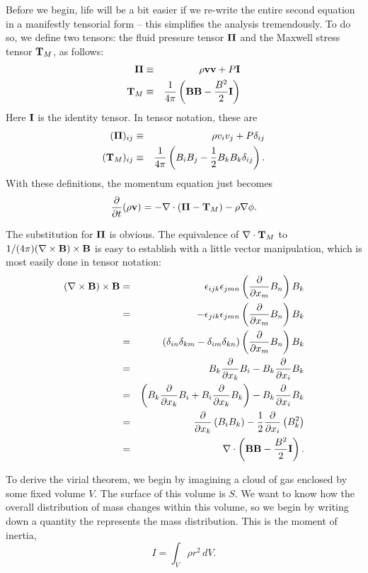 Before we begin, life will be a bit easier if we re-write the entire second equation in a manifestly tensorial form -- this simplifies the analysis tremendously. To do so, we define two tensors: the fluid pressure tensor $\boldsymbol{\Pi}$ and the Maxwell stress tensor $\mathbf{T}_M$, as follows:
\begin{eqnarray}
\boldsymbol{\Pi} & \equiv & \rho \mathbf{v}\mathbf{v} + P\mathbf{I} \\
\mathbf{T}_M & \equiv & \frac{1}{4\pi} \left(\mathbf{B}\mathbf{B} - \frac{B^2}{2}\mathbf{I}\right)
\end{eqnarray}
Here $\mathbf{I}$ is the identity tensor. In tensor notation, these are
\begin{eqnarray}
(\boldsymbol{\Pi})_{ij} & \equiv & \rho v_i v_j + P \delta_{ij} \\
(\mathbf{T}_M)_{ij} & \equiv & \frac{1}{4\pi} \left(B_i B_j - \frac{1}{2}B_k B_k \delta_{ij}\right).
\end{eqnarray}
With these definitions, the momentum equation just becomes
\begin{equation}
\frac{\partial}{\partial t}(\rho \mathbf{v}) = -\nabla\cdot(\boldsymbol{\Pi}-\mathbf{T}_M) - \rho \nabla\phi.
\end{equation}

The substitution for $\boldsymbol{\Pi}$ is obvious. The equivalence of $\nabla\cdot\mathbf{T}_M$ to $1/(4\pi) (\nabla\times\mathbf{B})\times\mathbf{B}$ is easy to establish with a little vector manipulation, which is most easily done in tensor notation:
\begin{eqnarray}
(\nabla\times\mathbf{B})\times\mathbf{B} & = & \epsilon_{ijk} \epsilon_{jmn} \left(\frac{\partial}{\partial x_m}B_n\right) B_k \\
& = & -\epsilon_{jik} \epsilon_{jmn} \left(\frac{\partial}{\partial x_m}B_n\right) B_k \\
& = & (\delta_{in}\delta_{km}-\delta_{im}\delta_{kn})\left(\frac{\partial}{\partial x_m}B_n\right) B_k \\
& = & B_k\frac{\partial}{\partial x_k} B_i - B_k\frac{\partial}{\partial x_i} B_k \\
& = & \left(B_k\frac{\partial}{\partial x_k} B_i + B_i \frac{\partial}{\partial x_k} B_k\right) - B_k\frac{\partial}{\partial x_i} B_k \\
& = & \frac{\partial}{\partial x_k}\left(B_i B_k\right) -\frac{1}{2} \frac{\partial}{\partial x_i} \left(B_k^2\right)\\
& = & \nabla\cdot \left(\mathbf{B}\mathbf{B} - \frac{B^2}{2}\mathbf{I}\right).
\end{eqnarray}

To derive the virial theorem, we begin by imagining a cloud of gas enclosed by some fixed volume $V$. The surface of this volume is $S$. We want to know how the overall distribution of mass changes within this volume, so we begin by writing down a quantity the represents the mass distribution. This is the moment of inertia,
\begin{equation}
I = \int_V \rho r^2\, dV.
\end{equation}

